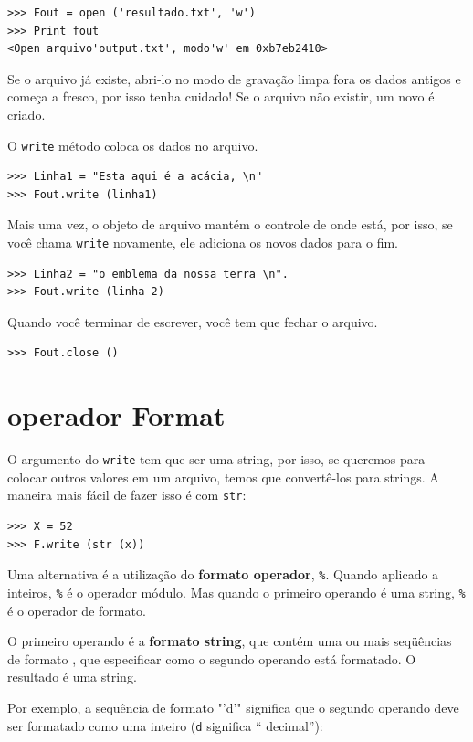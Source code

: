 \documentclass[10pt]{book}
\begin{document}
\begin{v erbatim}
\begin{verbatim}
>>> Fout = open ('resultado.txt', 'w')
>>> Print fout
<Open arquivo'output.txt', modo'w' em 0xb7eb2410>
\end{verbatim}
%
Se o arquivo já existe, abri-lo no modo de gravação limpa fora
os dados antigos e começa a fresco, por isso tenha cuidado!
Se o arquivo não existir, um novo é criado.

O {\tt write} método coloca os dados no arquivo.

\begin{verbatim}
>>> Linha1 = "Esta aqui é a acácia, \n"
>>> Fout.write (linha1)
\end{verbatim}
%
Mais uma vez, o objeto de arquivo mantém o controle de onde está, por isso, se
você chama {\tt write} novamente, ele adiciona os novos dados para o fim.

\begin{verbatim}
>>> Linha2 = "o emblema da nossa terra \n".
>>> Fout.write (linha 2)
\end{verbatim}
%
Quando você terminar de escrever, você tem que fechar o arquivo.

\begin{verbatim}
>>> Fout.close ()
\end{verbatim}
%


\section{operador Format}

O argumento do {\tt write} tem que ser uma string, por isso, se queremos
para colocar outros valores em um arquivo, temos que convertê-los para
strings. A maneira mais fácil de fazer isso é com {\tt str}:

\begin{verbatim}
>>> X = 52
>>> F.write (str (x))
\end{verbatim}
%
Uma alternativa é a utilização do {\bf formato operador}, {\tt \%}. Quando
aplicado a inteiros, {\tt \%} é o operador módulo. Mas
quando o primeiro operando é uma string, {\tt \%} é o operador de formato.

O primeiro operando é a {\bf formato string}, que contém
uma ou mais seqüências de formato {\bf}, que
especificar como
o segundo operando está formatado. O resultado é uma string.

Por exemplo, a sequência de formato \verbo "'d'" significa que
o segundo operando deve ser formatado como uma
inteiro ({\tt d} significa `` decimal''):


\end{v erbatim}
\end{document}
